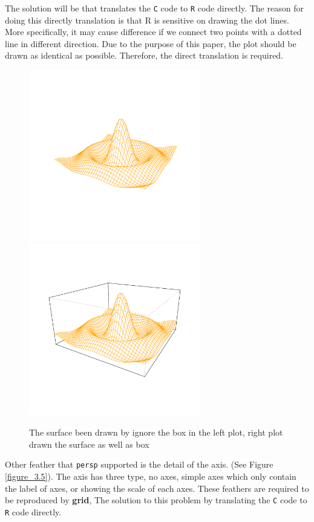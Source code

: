 \documentclass{report}
\begin{document}
The solution will be that translates the \texttt{C} code to \texttt{R} code directly. The reason for doing this directly translation is that R is sensitive on drawing the dot lines. More specifically, it may cause difference if we connect two points with a dotted line in different direction. Due to the purpose of this paper, the plot should be drawn as identical as possible. Therefore, the direct translation is required.\\


\begin{figure}[h]
	\begin{center}
		\includegraphics[height = 7.5cm, width = 7.5cm]{figure/box_example_1.pdf}
		\includegraphics[height = 7.5cm, width = 7.5cm]{figure/box_example_2.pdf}
		\caption{The surface been drawn by ignore the box in the left plot, right plot drawn the surface as well as box}
		\label{figure_3.4}
	\end{center}
\end{figure}

Other feather that \texttt{persp} supported is the detail of the axis. (See Figure \ref{figure_3.5}). The axis has three type, no axes, simple axes which only contain the label of axes, or showing the scale of each axes. These feathers are required to be reproduced by \textbf{grid}, The solution to this problem by translating the \texttt{C} code to \texttt{R} code directly.
\end{document}
